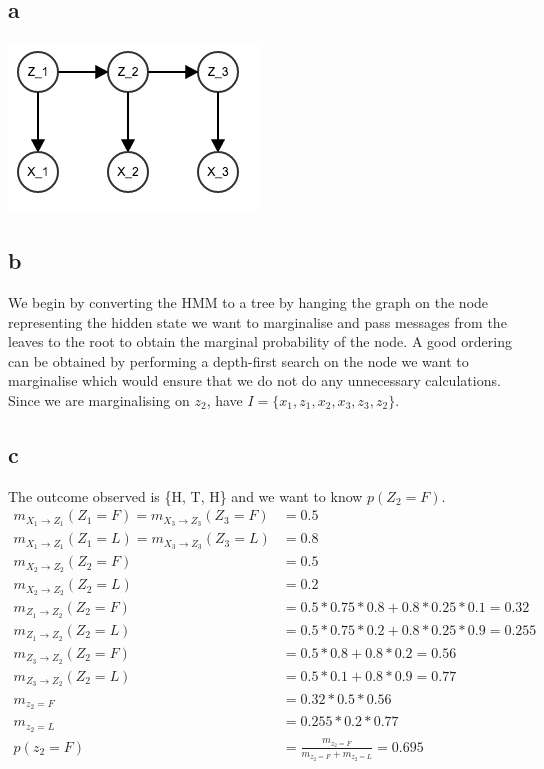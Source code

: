 \documentclass[twoside]{homework}
\begin{document}
\subsection*{a}
\includegraphics[scale=0.5]{4a}
\subsection*{b}
We begin by converting the HMM to a tree by hanging the graph on the node representing the hidden state we want to marginalise and pass messages from the leaves to the root to obtain the marginal probability of the node. A good ordering can be obtained by performing a depth-first search on the node we want to marginalise which would ensure that we do not do any unnecessary calculations. Since we are marginalising on $z_2$, have $I = \{x_1, z_1, x_2, x_3, z_3, z_2\}$. 
\subsection*{c}
The outcome observed is \{H, T, H\} and we want to know $p(Z_2 = F)$.
\begin{align*}
m_{X_1 \rightarrow Z_1}(Z_1 = F) = m_{X_3 \rightarrow Z_3}(Z_3 = F) &= 0.5 \\
m_{X_1 \rightarrow Z_1}(Z_1 = L) = m_{X_3 \rightarrow Z_3}(Z_3 = L) &= 0.8 \\
m_{X_2 \rightarrow Z_2}(Z_2 = F) &= 0.5 \\
m_{X_2 \rightarrow Z_2}(Z_2 = L) &= 0.2 \\
m_{Z_1 \rightarrow Z_2}(Z_2 = F) &= 0.5 * 0.75 * 0.8 + 0.8 * 0.25 * 0.1 = 0.32\\
m_{Z_1 \rightarrow Z_2}(Z_2 = L) &= 0.5 * 0.75 * 0.2 + 0.8 * 0.25 * 0.9 = 0.255\\
m_{Z_3 \rightarrow Z_2}(Z_2 = F) &= 0.5 * 0.8 + 0.8 * 0.2 = 0.56\\
m_{Z_3 \rightarrow Z_2}(Z_2 = L) &= 0.5 * 0.1 + 0.8 * 0.9 = 0.77\\
m_{z_2 = F} &= 0.32 *0.5 * 0.56\\
m_{z_2 = L} &= 0.255 * 0.2 * 0.77\\
p(z_2 = F) &= \frac{m_{z_2 = F}}{m_{z_2 = F} + m_{z_2 = L}} = 0.695
\end{align*}
\end{document}
